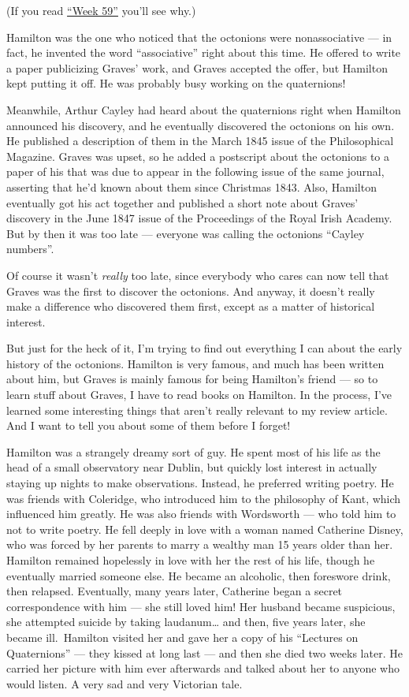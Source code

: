 \documentclass{article}
\begin{document}
(If you read \protect\hyperlink{week59}{``Week 59''} you'll see why.)

Hamilton was the one who noticed that the octonions were nonassociative
--- in fact, he invented the word ``associative'' right about this time.
He offered to write a paper publicizing Graves' work, and Graves
accepted the offer, but Hamilton kept putting it off. He was probably
busy working on the quaternions!

Meanwhile, Arthur Cayley had heard about the quaternions right when
Hamilton announced his discovery, and he eventually discovered the
octonions on his own. He published a description of them in the March
1845 issue of the Philosophical Magazine. Graves was upset, so he added
a postscript about the octonions to a paper of his that was due to
appear in the following issue of the same journal, asserting that he'd
known about them since Christmas 1843. Also, Hamilton eventually got his
act together and published a short note about Graves' discovery in the
June 1847 issue of the Proceedings of the Royal Irish Academy. But by
then it was too late --- everyone was calling the octonions ``Cayley
numbers''.

Of course it wasn't \emph{really} too late, since everybody who cares
can now tell that Graves was the first to discover the octonions. And
anyway, it doesn't really make a difference who discovered them first,
except as a matter of historical interest.

But just for the heck of it, I'm trying to find out everything I can
about the early history of the octonions. Hamilton is very famous, and
much has been written about him, but Graves is mainly famous for being
Hamilton's friend --- so to learn stuff about Graves, I have to read
books on Hamilton. In the process, I've learned some interesting things
that aren't really relevant to my review article. And I want to tell you
about some of them before I forget!

Hamilton was a strangely dreamy sort of guy. He spent most of his life
as the head of a small observatory near Dublin, but quickly lost
interest in actually staying up nights to make observations. Instead, he
preferred writing poetry. He was friends with Coleridge, who introduced
him to the philosophy of Kant, which influenced him greatly. He was also
friends with Wordsworth --- who told him to not to write poetry. He fell
deeply in love with a woman named Catherine Disney, who was forced by
her parents to marry a wealthy man 15 years older than her. Hamilton
remained hopelessly in love with her the rest of his life, though he
eventually married someone else. He became an alcoholic, then foreswore
drink, then relapsed. Eventually, many years later, Catherine began a
secret correspondence with him --- she still loved him! Her husband
became suspicious, she attempted suicide by taking laudanum\ldots{} and
then, five years later, she became ill.~Hamilton visited her and gave
her a copy of his ``Lectures on Quaternions'' --- they kissed at long
last --- and then she died two weeks later. He carried her picture with
him ever afterwards and talked about her to anyone who would listen. A
very sad and very Victorian tale.
\end{document}
